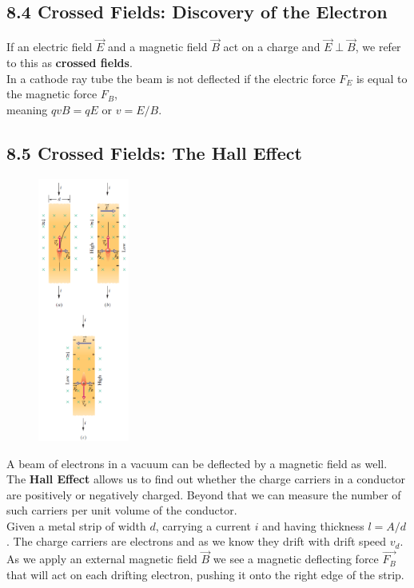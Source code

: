 \documentclass[12pt, a4paper]{article}
\begin{document}
		
		
		\subsection*{8.4 Crossed Fields: Discovery of the Electron}
		
		
		If an electric field $\vec{E}$ and a magnetic field $\vec{B}$ act on a charge and $\vec{E} \perp \vec{B}$, we refer to this as \textbf{crossed fields}. \\
		In a cathode ray tube the beam is not deflected if the electric force $F_E$ is equal to the magnetic force $F_B$, \\ meaning $q v B = q E$ or $v = E / B$.
		
		
		
		
		\subsection*{8.5 Crossed Fields: The Hall Effect}
		
		\begin{figure}
			\centering
			\includegraphics[width=3cm]{Physics2_PNGs/hall-effect.png}
			\caption*{}
			\label{fig:hall-effect.png}
		\end{figure}
		A beam of electrons in a vacuum can be deflected by a magnetic field as well. \\ 
		The \textbf{Hall Effect} allows us to find out whether the charge carriers in a conductor are positively or negatively charged. Beyond that we can measure the number of such carriers per unit volume of the conductor. \\
		Given a metal strip of width $d$, carrying a current $i$ and having thickness $l = A / d$. The charge carriers are electrons and as we know they drift with drift speed $v_d$. As we apply an external magnetic field $\vec{B}$ we see a magnetic deflecting force $\vec{F_B}$ that will act on each drifting electron, pushing it onto the right edge of the strip.
		
\end{document}
